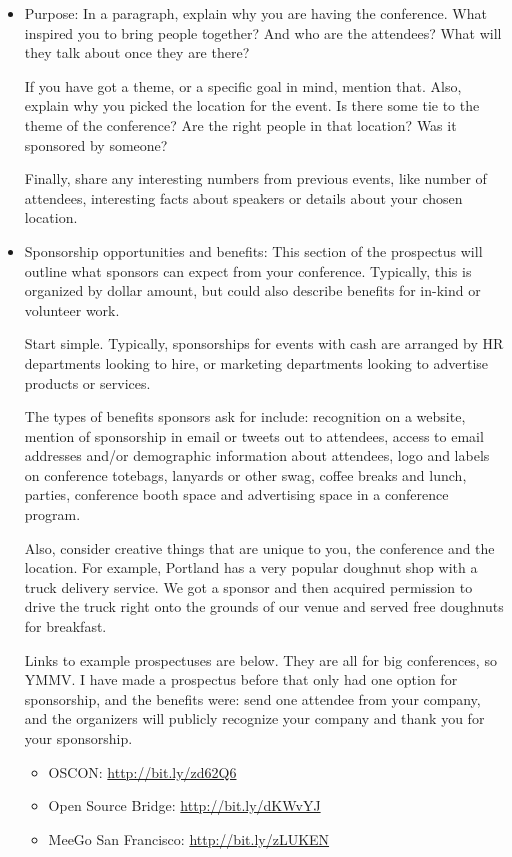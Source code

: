 \begin{itemize}
\item Purpose:
In a paragraph, explain why you are having the conference. What inspired you to
bring people together? And who are the attendees? What will they talk about once
they are there? 

If you have got a theme, or a specific goal in mind, mention that. Also, explain
why you picked the location for the event. Is there some tie to the theme of the
conference? Are the right people in that location? Was it sponsored by someone?

Finally, share any interesting numbers from previous events, like number of
attendees, interesting facts about speakers or details about your chosen
location. 

\item Sponsorship opportunities and benefits:
This section of the prospectus will outline what sponsors can expect from your
conference. Typically, this is organized by dollar amount, but could also
describe benefits for in-kind or volunteer work.

Start simple. Typically, sponsorships for events with cash are arranged by HR
departments looking to hire, or marketing departments looking to advertise
products or services. 

The types of benefits sponsors ask for include: recognition on a website,
mention of sponsorship in email or tweets out to attendees, access to email
addresses and/or demographic information about attendees, logo and labels on
conference totebags, lanyards or other swag, coffee breaks and lunch, parties,
conference booth space and advertising space in a conference program. 

Also, consider creative things that are unique to you, the conference and the
location. For example, Portland has a very popular doughnut shop with a truck
delivery service. We got a sponsor and then acquired permission to drive the
truck right onto the grounds of our venue and served free doughnuts for
breakfast.

Links to example prospectuses are below. They are all for big conferences, so
YMMV. I have made a prospectus before that
only had one option for sponsorship, and the benefits were: send one attendee
from your company, and the organizers will publicly recognize your company and 
thank you for your sponsorship.
\begin{itemize}
\item OSCON: \url{http://bit.ly/zd62Q6}
\item Open Source Bridge: \url{http://bit.ly/dKWvYJ}
\item MeeGo San Francisco: \url{http://bit.ly/zLUKEN}
\end{itemize}


\end{itemize}
